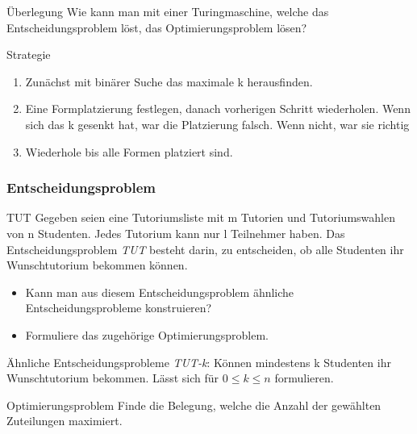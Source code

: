 \documentclass{beamer}
\begin{document}
{\begin{frame}
 \begin{block}{Überlegung}
  Wie kann man mit einer Turingmaschine, welche das Entscheidungsproblem löst, das Optimierungsproblem lösen?
 \end{block}
\begin{block}{Strategie}
 \begin{enumerate}
  \item Zunächst mit binärer Suche das maximale k herausfinden.
  \item Eine Formplatzierung festlegen, danach vorherigen Schritt wiederholen. Wenn sich das k gesenkt hat, war die Platzierung falsch. 
  Wenn nicht, war sie richtig
  \item Wiederhole bis alle Formen platziert sind.
 \end{enumerate}
\end{block}
\end{frame}



\begin{frame}
 \frametitle{Entscheidungsproblem}
 \begin{block}{TUT}
  Gegeben seien eine Tutoriumsliste mit m Tutorien und Tutoriumswahlen von n Studenten. Jedes Tutorium kann nur l Teilnehmer haben.
 Das Entscheidungsproblem \textit{TUT} besteht darin, zu entscheiden, ob alle Studenten ihr Wunschtutorium bekommen können.
 \end{block}
 \begin{itemize}
  \item Kann man aus diesem Entscheidungsproblem ähnliche Entscheidungsprobleme konstruieren?
  \item Formuliere das zugehörige Optimierungsproblem.
 \end{itemize}
\end{frame}

\begin{frame}
 \begin{block}{Ähnliche Entscheidungsprobleme}
  \textit{TUT-k}: Können mindestens k Studenten ihr Wunschtutorium bekommen.
  Lässt sich für $0 \leq k \leq n$ formulieren.
 \end{block}
 \begin{block}{Optimierungsproblem}
  Finde die Belegung, welche die Anzahl der gewählten Zuteilungen maximiert.
 \end{block}
\end{frame}

}
\end{document}
